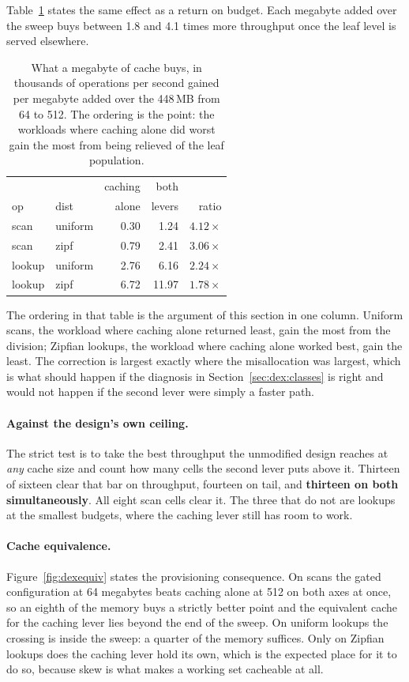 \documentclass[sigconf,nonacm]{acmart}
\begin{document}
Table~\ref{tab:productivity} states the same effect as a return on budget. Each
megabyte added over the sweep buys between 1.8 and 4.1 times more throughput once
the leaf level is served elsewhere.

\begin{table}[t]
\centering
\small
\caption{What a megabyte of cache buys, in thousands of operations per second
gained per megabyte added over the 448\,MB from 64 to 512. The ordering is the
point: the workloads where caching alone did worst gain the most from being
relieved of the leaf population.}
\label{tab:productivity}
\begin{tabular}{llrrr}
\toprule
 & & caching & both & \\
op & dist & alone & levers & ratio \\
\midrule
scan   & uniform & 0.30 & 1.24 & $\mathbf{4.12\times}$ \\
scan   & zipf    & 0.79 & 2.41 & $3.06\times$ \\
lookup & uniform & 2.76 & 6.16 & $2.24\times$ \\
lookup & zipf    & 6.72 & 11.97 & $1.78\times$ \\
\bottomrule
\end{tabular}
\end{table}

The ordering in that table is the argument of this section in one column. Uniform
scans, the workload where caching alone returned least, gain the most from the
division; Zipfian lookups, the workload where caching alone worked best, gain the
least. The correction is largest exactly where the misallocation was largest,
which is what should happen if the diagnosis in Section~\ref{sec:dex:classes} is
right and would not happen if the second lever were simply a faster path.

\paragraph{Against the design's own ceiling.}
The strict test is to take the best throughput the unmodified design reaches at
\emph{any} cache size and count how many cells the second lever puts above it.
Thirteen of sixteen clear that bar on throughput, fourteen on tail, and
\textbf{thirteen on both simultaneously}. All eight scan cells clear it. The three
that do not are lookups at the smallest budgets, where the caching lever still has
room to work.

\paragraph{Cache equivalence.}
Figure~\ref{fig:dexequiv} states the provisioning consequence. On scans the gated
configuration at 64 megabytes beats caching alone at 512 on both axes at once, so
an eighth of the memory buys a strictly better point and the equivalent cache for
the caching lever lies beyond the end of the sweep. On uniform lookups the
crossing is inside the sweep: a quarter of the memory suffices. Only on Zipfian
lookups does the caching lever hold its own, which is the expected place for it to
do so, because skew is what makes a working set cacheable at all.
\end{document}
